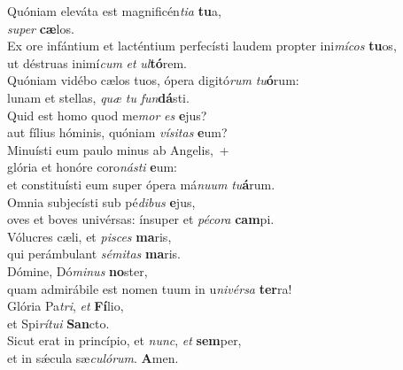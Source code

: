 \evenverse Quóniam eleváta est magnificén\textit{ti}\textit{a} \textbf{tu}a,~\*\\
\evenverse \textit{su}\textit{per} \textbf{cæ}los.\\
\oddverse Ex ore infántium et lacténtium perfecísti laudem propter ini\textit{mí}\textit{cos} \textbf{tu}os,~\*\\
\oddverse ut déstruas inimí\textit{cum} \textit{et} \textit{ul}\textbf{tó}rem.\\
\evenverse Quóniam vidébo cælos tuos, ópera digitó\textit{rum} \textit{tu}\textbf{ó}rum:~\*\\
\evenverse lunam et stellas, \textit{quæ} \textit{tu} \textit{fun}\textbf{dá}sti.\\
\oddverse Quid est homo quod me\textit{mor} \textit{es} \textbf{e}jus?~\*\\
\oddverse aut fílius hóminis, quóniam \textit{ví}\textit{si}\textit{tas} \textbf{e}um?\\
\evenverse Minuísti eum paulo minus ab Angelis,~+\\
\evenverse  glória et honóre coro\textit{ná}\textit{sti} \textbf{e}um:~\*\\
\evenverse et constituísti eum super ópera má\textit{nu}\textit{um} \textit{tu}\textbf{á}rum.\\
\oddverse Omnia subjecísti sub pé\textit{di}\textit{bus} \textbf{e}jus,~\*\\
\oddverse oves et boves univérsas: ínsuper et \textit{pé}\textit{co}\textit{ra} \textbf{cam}pi.\\
\evenverse Vólucres cæli, et \textit{pi}\textit{sces} \textbf{ma}ris,~\*\\
\evenverse qui perámbulant \textit{sé}\textit{mi}\textit{tas} \textbf{ma}ris.\\
\oddverse Dómine, Dó\textit{mi}\textit{nus} \textbf{no}ster,~\*\\
\oddverse quam admirábile est nomen tuum in u\textit{ni}\textit{vér}\textit{sa} \textbf{ter}ra!\\
\evenverse Glória Pa\textit{tri}, \textit{et} \textbf{Fí}lio,~\*\\
\evenverse et Spi\textit{rí}\textit{tu}\textit{i} \textbf{San}cto.\\
\oddverse Sicut erat in princípio, et \textit{nunc}, \textit{et} \textbf{sem}per,~\*\\
\oddverse et in sǽcula sæ\textit{cu}\textit{ló}\textit{rum}. \textbf{A}men.\\

